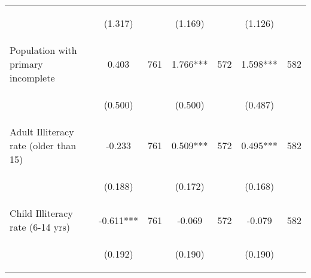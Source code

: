 \begin{tabular}{lcccccc}
\vspace{4pt} &  \begin{footnotesize}(1.317)\end{footnotesize}   & &
			    \begin{footnotesize}(1.169)\end{footnotesize}   & &
			    \begin{footnotesize}(1.126)\end{footnotesize}   &
			     \\          

Population with primary incomplete   &  0.403   &  761  &   1.766***  &  572 &  1.598***  &  582   \\

\vspace{4pt} &  \begin{footnotesize}(0.500)\end{footnotesize}   & &
			    \begin{footnotesize}(0.500)\end{footnotesize}   & &
			    \begin{footnotesize}(0.487)\end{footnotesize}   &
			     \\          

Adult Illiteracy rate (older than 15)   &  -0.233   &  761  &   0.509***  &  572 &  0.495***  &  582   \\

\vspace{4pt} &  \begin{footnotesize}(0.188)\end{footnotesize}   & &
			    \begin{footnotesize}(0.172)\end{footnotesize}   & &
			    \begin{footnotesize}(0.168)\end{footnotesize}   &
			     \\          

Child Illiteracy rate (6-14 yrs)   &  -0.611***   &  761  &   -0.069  &  572 &  -0.079  &  582   \\

\vspace{4pt} &  \begin{footnotesize}(0.192)\end{footnotesize}   & &
			    \begin{footnotesize}(0.190)\end{footnotesize}   & &
			    \begin{footnotesize}(0.190)\end{footnotesize}   &
			     \\          


\end{tabular}
